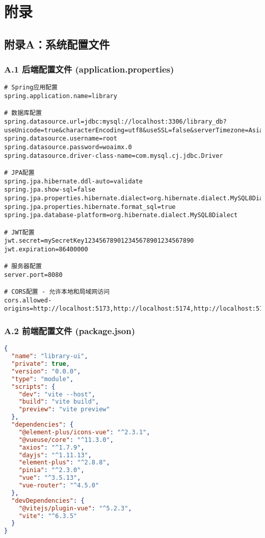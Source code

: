 \documentclass[12pt,a4paper]{article}
\begin{document}
\section*{附录}

\subsection*{附录A：系统配置文件}

\subsubsection*{A.1 后端配置文件 (application.properties)}
\begin{lstlisting}[language=properties]
# Spring应用配置
spring.application.name=library

# 数据库配置
spring.datasource.url=jdbc:mysql://localhost:3306/library_db?useUnicode=true&characterEncoding=utf8&useSSL=false&serverTimezone=Asia/Shanghai&allowPublicKeyRetrieval=true&useAffectedRows=true
spring.datasource.username=root
spring.datasource.password=woaimx.0
spring.datasource.driver-class-name=com.mysql.cj.jdbc.Driver

# JPA配置
spring.jpa.hibernate.ddl-auto=validate
spring.jpa.show-sql=false
spring.jpa.properties.hibernate.dialect=org.hibernate.dialect.MySQL8Dialect
spring.jpa.properties.hibernate.format_sql=true
spring.jpa.database-platform=org.hibernate.dialect.MySQL8Dialect

# JWT配置
jwt.secret=mySecretKey123456789012345678901234567890
jwt.expiration=86400000

# 服务器配置
server.port=8080

# CORS配置 - 允许本地和局域网访问
cors.allowed-origins=http://localhost:5173,http://localhost:5174,http://localhost:5175,http://localhost:5176,http://localhost:5177,http://localhost:5178,http://localhost:5179,http://localhost:5180,http://192.168.0.100:5173,http://192.168.0.100:5174,http://192.168.0.100:5175,http://192.168.0.100:5176,http://192.168.0.100:5177,http://192.168.0.100:5178,http://192.168.0.100:5179,http://192.168.0.100:5180
\end{lstlisting}

\subsubsection*{A.2 前端配置文件 (package.json)}
\begin{lstlisting}[language=json]
{
  "name": "library-ui",
  "private": true,
  "version": "0.0.0",
  "type": "module",
  "scripts": {
    "dev": "vite --host",
    "build": "vite build",
    "preview": "vite preview"
  },
  "dependencies": {
    "@element-plus/icons-vue": "^2.3.1",
    "@vueuse/core": "^11.3.0",
    "axios": "^1.7.9",
    "dayjs": "^1.11.13",
    "element-plus": "^2.8.8",
    "pinia": "^2.3.0",
    "vue": "^3.5.13",
    "vue-router": "^4.5.0"
  },
  "devDependencies": {
    "@vitejs/plugin-vue": "^5.2.3",
    "vite": "^6.3.5"
  }
}
\end{lstlisting}
\end{document}
